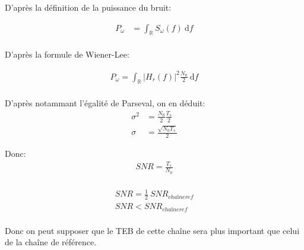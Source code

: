 \documentclass[frenchb]{article}
\begin{document}
\begin{enumerate}
        D'après la définition de la puissance du bruit:
        
        \begin{equation*}
        \begin{split}
        P_{\omega} &= \int_\mathbb{R}S_{\omega}(f) \ \mathrm{d}f \\
        \end{split}
        \end{equation*}
        
        D'après la formule de Wiener-Lee:
        
        \begin{equation*}
        \begin{split}
        P_{\omega} = \int_{\mathbb{R}}|H_r(f)|^2 \frac{N_0}{2} \ \mathrm{d}f \\
        \end{split}
        \end{equation*}
        
        D'après notammant l'égalité de Parseval, on en déduit:
        \begin{equation*}
        \begin{split}
        \sigma^2 &= \frac{N_0}{2} \frac{T_s}{2}  \\
        \sigma &= \frac{\sqrt{N_0 T_s}}{2}
        \end{split}
        \end{equation*}
        
        Donc: 
        \begin{equation*}
        \begin{split}
        \boxed{SNR = \frac{T_s}{N_0}}  \\
        \end{split}
        \end{equation*}
        
        \begin{equation*}
        \begin{split}
        SNR = \frac{1}{2} \ SNR_{chaîneref} \\
        SNR < SNR_{chaîneref} \\
        \end{split}
        \end{equation*}
        
        Donc on peut supposer que le TEB de cette chaîne sera plus important que celui de la chaîne de référence. 
        \par\leavevmode\par
        

\end{enumerate}
\end{document}
